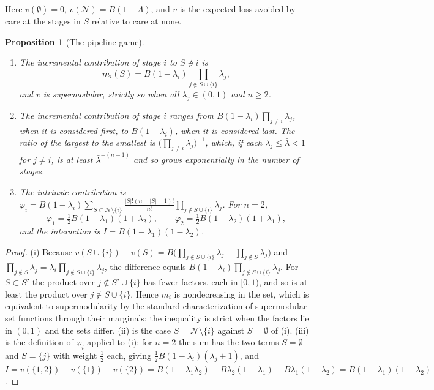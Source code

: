 \documentclass[11pt]{article}
\newcommand{\N}{\mathcal N}
\theoremstyle{plain}
\newtheorem{proposition}{Proposition}
\theoremstyle{definition}
\begin{document}
Here $v(\emptyset)=0$, $v(\N)=B(1-\Lambda)$, and $v$ is the expected loss avoided by care at the stages in $S$ relative to care at none.

\begin{proposition}[The pipeline game]\label{prop:pipeline}
\begin{enumerate}[label=(\roman*),nosep]
\item The incremental contribution of stage $i$ to $S\not\ni i$ is
\[
m_i(S)=B(1-\lambda_i)\prod_{j\notin S\cup\{i\}}\lambda_j,
\]
and $v$ is supermodular, strictly so when all $\lambda_j\in(0,1)$ and $n\ge2$.
\item The incremental contribution of stage $i$ ranges from $B(1-\lambda_i)\prod_{j\ne i}\lambda_j$, when it is considered first, to $B(1-\lambda_i)$, when it is considered last. The ratio of the largest to the smallest is $\bigl(\prod_{j\ne i}\lambda_j\bigr)^{-1}$, which, if each $\lambda_j\le\bar\lambda<1$ for $j\ne i$, is at least $\bar\lambda^{-(n-1)}$ and so grows exponentially in the number of stages.
\item The intrinsic contribution is $\varphi_i=B(1-\lambda_i)\sum_{S\subset\N\setminus\{i\}}\frac{|S|!(n-|S|-1)!}{n!}\prod_{j\notin S\cup\{i\}}\lambda_j$. For $n=2$,
\[
\varphi_1=\tfrac12B(1-\lambda_1)(1+\lambda_2),\qquad\varphi_2=\tfrac12B(1-\lambda_2)(1+\lambda_1),
\]
and the interaction is $I=B(1-\lambda_1)(1-\lambda_2)$.
\end{enumerate}
\end{proposition}

\begin{proof}
(i) Because $v(S\cup\{i\})-v(S)=B\bigl(\prod_{j\notin S\cup\{i\}}\lambda_j-\prod_{j\notin S}\lambda_j\bigr)$ and $\prod_{j\notin S}\lambda_j=\lambda_i\prod_{j\notin S\cup\{i\}}\lambda_j$, the difference equals $B(1-\lambda_i)\prod_{j\notin S\cup\{i\}}\lambda_j$. For $S\subset S'$ the product over $j\notin S'\cup\{i\}$ has fewer factors, each in $[0,1)$, and so is at least the product over $j\notin S\cup\{i\}$. Hence $m_i$ is nondecreasing in the set, which is equivalent to supermodularity by the standard characterization of supermodular set functions through their marginals; the inequality is strict when the factors lie in $(0,1)$ and the sets differ.
(ii) is the case $S=\N\setminus\{i\}$ against $S=\emptyset$ of (i). (iii) is the definition of $\varphi_i$ applied to (i); for $n=2$ the sum has the two terms $S=\emptyset$ and $S=\{j\}$ with weight $\tfrac12$ each, giving $\tfrac12B(1-\lambda_i)(\lambda_j+1)$, and $I=v(\{1,2\})-v(\{1\})-v(\{2\})=B(1-\lambda_1\lambda_2)-B\lambda_2(1-\lambda_1)-B\lambda_1(1-\lambda_2)=B(1-\lambda_1)(1-\lambda_2)$.
\end{proof}
\end{document}
